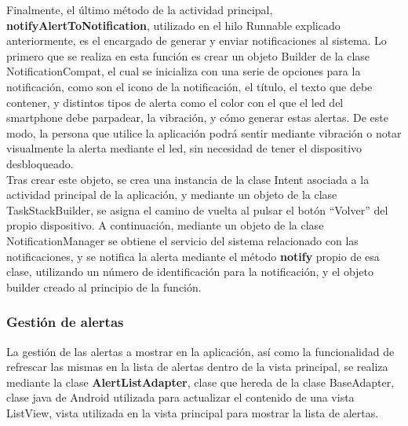         \vspace{0.3cm}

        Finalmente, el último método de la actividad principal, \textbf{notifyAlertToNotification}, utilizado en el hilo Runnable explicado anteriormente, es el encargado de generar y enviar notificaciones al sistema. Lo primero que se realiza en esta función es crear un objeto Builder de la clase NotificationCompat, el cual se inicializa con una serie de opciones para la notificación, como son el icono de la notificación, el título, el texto que debe contener, y distintos tipos de alerta como el color con el que el led del smartphone debe parpadear, la vibración, y cómo generar estas alertas. De este modo, la persona que utilice la aplicación podrá sentir mediante vibración o notar visualmente la alerta mediante el led, sin necesidad de tener el dispositivo desbloqueado. \\

        Tras crear este objeto, se crea una instancia de la clase Intent asociada a la actividad principal de la aplicación, y mediante un objeto de la clase TaskStackBuilder, se asigna el camino de vuelta al pulsar el botón ``Volver'' del propio dispositivo. A continuación, mediante un objeto de la clase NotificationManager se obtiene el servicio del sistema relacionado con las notificaciones, y se notifica la alerta mediante el método \textbf{notify} propio de esa clase, utilizando un número de identificación para la notificación, y el objeto builder creado al principio de la función.


        \subsubsection{Gestión de alertas}
        \label{sec:alertlistadapter}

        La gestión de las alertas a mostrar en la aplicación, así como la funcionalidad de refrescar las mismas en la lista de alertas dentro de la vista principal, se realiza mediante la clase \textbf{AlertListAdapter}, clase que hereda de la clase BaseAdapter, clase java de Android utilizada para actualizar el contenido de una vista ListView, vista utilizada en la vista principal para mostrar la lista de alertas. \\

        \vspace{0.3cm}

